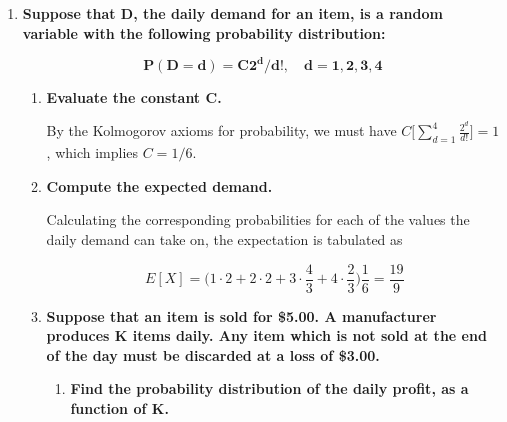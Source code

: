 \documentclass[10pt, oneside]{article}
\begin{document}
\begin{enumerate}[label=7.\arabic*]
\[ E[\text{net profit}] = 250(0.8) + (-750)(0.2) = \boxed{\$50} \]

\item  \begin{tcolorbox}[
  colback=Cerulean!5!white,
  colframe=Cerulean!75!black]
\textbf{Suppose that $\bm{D}$, the daily demand for an item, is a random variable with the following probability distribution:}

\[ \bm{P(D=d) = C 2^d / d!,  \quad d = 1, 2, 3, 4} \]
\end{tcolorbox}

	\begin{enumerate}
	\item  \begin{tcolorbox}[
	  colback=Cerulean!5!white,
	  colframe=Cerulean!75!black]
	\textbf{Evaluate the constant $\bm{C}$.}
	\end{tcolorbox}
	
	By the Kolmogorov axioms for probability, we must have $C \Big[ \sum^4_{d=1} \frac{2^d}{d!} \Big] = 1$, which implies $\boxed{C = 1/6}$.
	
	\item  \begin{tcolorbox}[
	  colback=Cerulean!5!white,
	  colframe=Cerulean!75!black]
	\textbf{Compute the expected demand.}
	\end{tcolorbox}
	
	Calculating the corresponding probabilities for each of the values the daily demand can take on, the expectation is tabulated as
	
	\[ E[X] = \Big( 1 \cdot 2 + 2 \cdot 2 + 3 \cdot \frac{4}{3} + 4 \cdot \frac{2}{3} \Big) \frac{1}{6} = \boxed{\frac{19}{9}} \]
	
	\item  \begin{tcolorbox}[
	  colback=Cerulean!5!white,
	  colframe=Cerulean!75!black]
	\textbf{Suppose that an item is sold for \$5.00. A manufacturer produces $\bm{K}$ items daily. Any item which is not sold at the end of the day must be discarded at a loss of \$3.00. }
	\end{tcolorbox}
	
		\begin{enumerate}
		\item  \begin{tcolorbox}[
	 	 colback=Cerulean!5!white,
	 	 colframe=Cerulean!75!black]
		\textbf{Find the probability distribution of the daily profit, as a function of $\bm{K}$.}
		\end{tcolorbox}
		

\end{enumerate}
\end{enumerate}
\end{enumerate}
\end{document}
